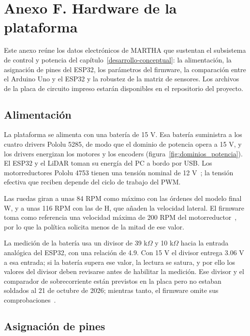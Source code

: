 \clearpage
\section{Anexo F. Hardware de la plataforma}
\label{anexo:hardware}

Este anexo reúne los datos electrónicos de MARTHA que sustentan el subsistema de control y potencia del capítulo~\ref{desarrollo-conceptual}: la alimentación, la asignación de pines del ESP32, los parámetros del firmware, la comparación entre el Arduino Uno y el ESP32 y la robustez de la matriz de sensores. Los archivos de la placa de circuito impreso estarán disponibles en el repositorio del proyecto.

\subsection{Alimentación}

La plataforma se alimenta con una batería de 15 V. Esa batería suministra a los cuatro drivers Pololu 5285, de modo que el dominio de potencia opera a 15 V, y los drivers energizan los motores y los encoders (figura~\ref{fig:dominios_potencia}). El ESP32 y el LiDAR toman su energía del PC a bordo por USB. Los motorreductores Pololu 4753 tienen una tensión nominal de 12 V~\cite{pololu4753}; la tensión efectiva que reciben depende del ciclo de trabajo del PWM.

Las ruedas giran a unas 84 RPM como máximo con las órdenes del modelo final W, y a unas 116 RPM con las de H, que añaden la velocidad lateral. El firmware toma como referencia una velocidad máxima de 200 RPM del motorreductor~\cite{repoMartha}, por lo que la política solicita menos de la mitad de ese valor.

La medición de la batería usa un divisor de 39 k$\Omega$ y 10 k$\Omega$ hacia la entrada analógica del ESP32, con una relación de 4.9. Con 15 V el divisor entrega 3.06 V a esa entrada; si la batería supera ese valor, la lectura se satura, y por ello los valores del divisor deben revisarse antes de habilitar la medición. Ese divisor y el comparador de sobrecorriente están previstos en la placa pero no estaban soldados al 21 de octubre de 2026; mientras tanto, el firmware omite sus comprobaciones~\cite{repoMartha}.

\subsection{Asignación de pines}


